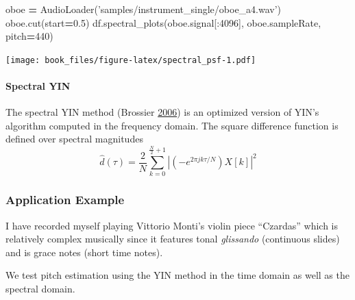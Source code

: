 \documentclass[american,]{article}
\newenvironment{Shaded}{\begin{snugshade}}{\end{snugshade}}
\newcommand{\DecValTok}[1]{\textcolor[rgb]{0.00,0.00,0.81}{#1}}
\newcommand{\FloatTok}[1]{\textcolor[rgb]{0.00,0.00,0.81}{#1}}
\newcommand{\NormalTok}[1]{#1}
\newcommand{\OperatorTok}[1]{\textcolor[rgb]{0.81,0.36,0.00}{\textbf{#1}}}
\newcommand{\StringTok}[1]{\textcolor[rgb]{0.31,0.60,0.02}{#1}}
\let\oldparagraph\paragraph
\renewcommand{\paragraph}[1]{\oldparagraph{#1}\mbox{}}
\begin{document}
\begin{Shaded}
\begin{Highlighting}[]
\NormalTok{oboe }\OperatorTok{=}\NormalTok{ AudioLoader(}\StringTok{'samples/instrument_single/oboe_a4.wav'}\NormalTok{)}
\NormalTok{oboe.cut(start}\OperatorTok{=}\FloatTok{0.5}\NormalTok{)}
\NormalTok{df.spectral_plots(oboe.signal[:}\DecValTok{4096}\NormalTok{], oboe.sampleRate, pitch}\OperatorTok{=}\DecValTok{440}\NormalTok{)}
\end{Highlighting}
\end{Shaded}

\texttt{[image: book\_files/figure-latex/spectral\_psf-1.pdf]}

\hypertarget{spectral-yin}{%
\paragraph{Spectral YIN}\label{spectral-yin}}

The spectral YIN method (Brossier \protect\hyperlink{ref-brossier}{2006}) is an optimized version of YIN's
algorithm computed in the frequency domain.
The square difference function is defined over spectral magnitudes
\[\hat{d}(\tau) = \frac{2}{N} \sum\limits_{k=0}^{\frac{N}{2}+1}
    \left\lvert\left(-e^{2\pi jk\tau/N}\right) X[k]\right\rvert^2\]

\hypertarget{application-example}{%
\subsubsection{Application Example}\label{application-example}}

I have recorded myself playing Vittorio Monti's
violin piece ``Czardas'' which is relatively
complex musically since it features tonal
\emph{glissando} (continuous slides) and is grace notes
(short time notes).

We test pitch estimation using the YIN method
in the time domain as well as the spectral domain.
\end{document}
